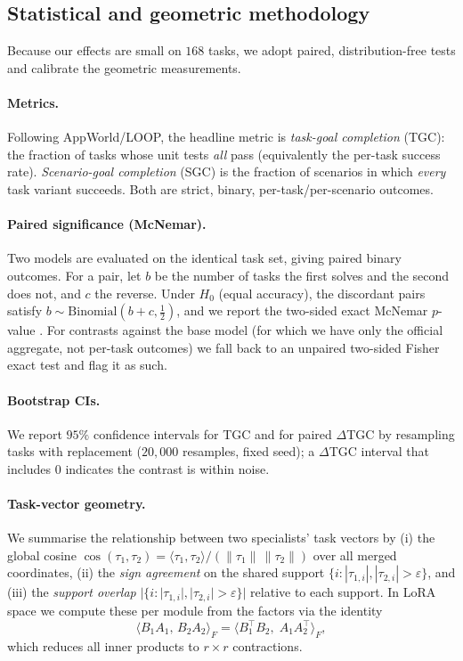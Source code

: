 \documentclass[11pt]{article}
\newcommand{\tv}{\tau}                      %
\begin{document}
\subsection{Statistical and geometric methodology}
\label{sec:prelim-stats}
Because our effects are small on $168$ tasks, we adopt paired, distribution-free tests
and calibrate the geometric measurements.

\paragraph{Metrics.} Following AppWorld/LOOP, the headline metric is \emph{task-goal
completion} (TGC): the fraction of tasks whose unit tests \emph{all} pass (equivalently
the per-task success rate). \emph{Scenario-goal completion} (SGC) is the fraction of
scenarios in which \emph{every} task variant succeeds. Both are strict, binary,
per-task/per-scenario outcomes.

\paragraph{Paired significance (McNemar).} Two models are evaluated on the identical task
set, giving paired binary outcomes. For a pair, let $b$ be the number of tasks the first
solves and the second does not, and $c$ the reverse. Under $H_0$ (equal accuracy), the
discordant pairs satisfy $b\sim\mathrm{Binomial}(b+c,\tfrac12)$, and we report the
two-sided exact McNemar $p$-value \citep{mcnemar1947}. For contrasts against the base
model (for which we have only the official aggregate, not per-task outcomes) we fall back
to an unpaired two-sided Fisher exact test and flag it as such.

\paragraph{Bootstrap CIs.} We report $95\%$ confidence intervals for TGC and for paired
$\Delta$TGC by resampling tasks with replacement ($20{,}000$ resamples, fixed seed); a
$\Delta$TGC interval that includes $0$ indicates the contrast is within noise.

\paragraph{Task-vector geometry.} We summarise the relationship between two specialists'
task vectors by (i) the global cosine
$\cos(\tv_1,\tv_2)=\langle\tv_1,\tv_2\rangle/(\|\tv_1\|\,\|\tv_2\|)$ over all merged
coordinates, (ii) the \emph{sign agreement} on the shared support
$\{i:|\tv_{1,i}|,|\tv_{2,i}|>\varepsilon\}$, and (iii) the \emph{support overlap}
$|\{i:|\tv_{1,i}|,|\tv_{2,i}|>\varepsilon\}|$ relative to each support. In LoRA space we
compute these per module from the factors via the identity
\begin{equation}
\langle B_1A_1,\,B_2A_2\rangle_F=\big\langle B_1^{\!\top}B_2,\;A_1A_2^{\!\top}\big\rangle_F,
\label{eq:fro}
\end{equation}
which reduces all inner products to $r\times r$ contractions.
\end{document}
